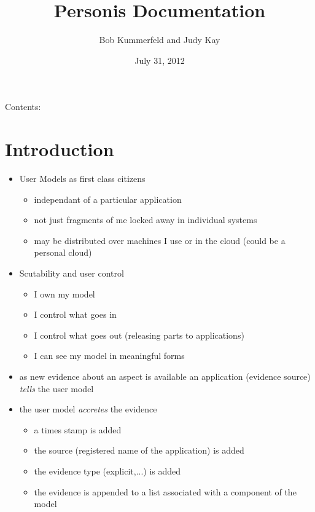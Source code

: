 \documentclass[a4paper,10pt,english]{sphinxmanual}
\title{Personis Documentation}
\date{July 31, 2012}
\author{Bob Kummerfeld and Judy Kay}
\begin{document}
\maketitle
\tableofcontents
{}\label{index::doc}


Contents:


\chapter{Introduction}
\label{Intro:introduction}\label{Intro::doc}\label{Intro:personis-user-modeling-framework}\begin{itemize}
\item {} 
User Models as first class citizens
\begin{itemize}
\item {} 
independant of a particular application

\item {} 
not just fragments of me locked away in individual systems

\item {} 
may be distributed over machines I use or in the cloud (could be a personal cloud)

\end{itemize}

\item {} 
Scutability and user control
\begin{itemize}
\item {} 
I own my model

\item {} 
I control what goes in

\item {} 
I control what goes out (releasing parts to applications)

\item {} 
I can see my model in meaningful forms

\end{itemize}

\item {} 
as new evidence about an aspect is available an application (evidence source) \emph{tells} the user model

\item {} 
the user model \emph{accretes} the evidence
\begin{itemize}
\item {} 
a times stamp is added

\item {} 
the source (registered name of the application) is added

\item {} 
the evidence type (explicit,...) is added

\item {} 
the evidence is appended to a list associated with a component of the model

\end{itemize}

\end{itemize}
\end{document}
